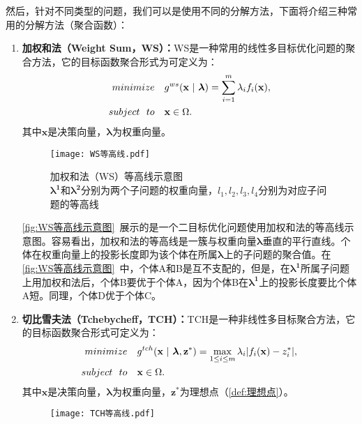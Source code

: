 然后，针对不同类型的问题，我们可以是使用不同的分解方法，下面将介绍三种常用的分解方法（聚合函数）：
\par
\begin{enumerate}
    \item \textbf{加权和法（Weight Sum，WS）：}WS是一种常用的线性多目标优化问题的聚合方法\cite{hillermeier2001nonlinear}，它的目标函数聚合形式为可定义为：
    \begin{align}
        \label{eq:WS}
        minimize \quad & g^{ws}(\mathbf{x} \ | \ \boldsymbol{\lambda}) = \sum_{i=1}^m \lambda_i f_i(\mathbf{x}), \\
        subject \ \ to \quad & \mathbf{x} \in \Omega. \notag
    \end{align}
    其中$\mathbf{x}$是决策向量，$\boldsymbol{\lambda}$为权重向量。
    \begin{figure}[htb]
        \texttt{[image: WS等高线.pdf]}
        \caption[加权和法（WS）等高线示意图]{加权和法（WS）等高线示意图 \\ $\boldsymbol{\lambda^1}$和$\boldsymbol{\lambda^2}$分别为两个子问题的权重向量，$l_1, l_2, l_3, l_4$分别为对应子问题的等高线}
        \label{fig:WS等高线示意图}
    \end{figure}
    \par
    \autoref{fig:WS等高线示意图}~展示的是一个二目标优化问题使用加权和法的等高线示意图。容易看出，加权和法的等高线是一簇与权重向量$\boldsymbol{\lambda}$垂直的平行直线。个体在权重向量上的投影长度即为该个体在所属$\boldsymbol{\lambda}$上的子问题的聚合值。在\autoref{fig:WS等高线示意图}~中，个体A和B是互不支配的，但是，在$\boldsymbol{\lambda^1}$所属子问题上用加权和法后，个体B要优于个体A，因为个体B在$\boldsymbol{\lambda^1}$上的投影长度要比个体A短。同理，个体D优于个体C。
    \item \textbf{切比雪夫法（Tchebycheff，TCH）：}TCH是一种非线性多目标聚合方法\cite{jaszkiewicz2002performance}，它的目标函数聚合形式可定义为：
    \begin{align}
        \label{eq:TCH}
        minimize \quad & g^{tch}(\mathbf{x} \ | \ \boldsymbol{\lambda},\mathbf{z}^*) = \max_{1 \leq i \leq m} \lambda_i | f_i(\mathbf{x}) - z^*_i |, \\
        subject \ \ to \quad & \mathbf{x} \in \Omega. \notag
    \end{align}
    其中$\mathbf{x}$是决策向量，$\boldsymbol{\lambda}$为权重向量，$\mathbf{z}^*$为理想点（\autoref{def:理想点}）。
    \par
    \begin{figure}[htb]
        \texttt{[image: TCH等高线.pdf]}

\end{figure}
\end{enumerate}
